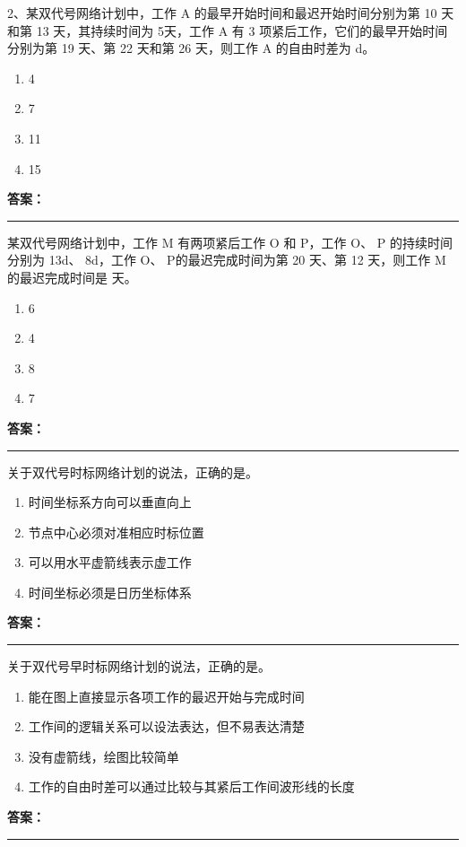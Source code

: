 \documentclass[UTF8,fontset=fandol,11pt]{ctexart}
\newcommand{\answerline}{\textcolor{answerred}{\rule{2.4cm}{0.7pt}}}
\begin{document}
\begin{quizbox}[title={第 8 题}]
2、某双代号网络计划中，工作 A 的最早开始时间和最迟开始时间分别为第 10 天和第 13 天，其持续时间为 5天，工作 A 有 3 项紧后工作，它们的最早开始时间分别为第 19 天、第 22 天和第 26 天，则工作 A 的自由时差为 d。\\
\begin{enumerate}[label=\Alph*.]
\item 4
\item 7
\item 11
\item 15
\end{enumerate}
\textbf{\textcolor{answerred}{答案：}} \answerline
\end{quizbox}

\begin{quizbox}[title={第 9 题}]
某双代号网络计划中，工作 M 有两项紧后工作 O 和 P，工作 O、 P 的持续时间分别为 13d、 8d，工作 O、 P的最迟完成时间为第 20 天、第 12 天，则工作 M 的最迟完成时间是 天。\\
\begin{enumerate}[label=\Alph*.]
\item 6
\item 4
\item 8
\item 7
\end{enumerate}
\textbf{\textcolor{answerred}{答案：}} \answerline
\end{quizbox}

\begin{quizbox}[title={第 10 题}]
关于双代号时标网络计划的说法，正确的是。\\
\begin{enumerate}[label=\Alph*.]
\item 时间坐标系方向可以垂直向上
\item 节点中心必须对准相应时标位置
\item 可以用水平虚箭线表示虚工作
\item 时间坐标必须是日历坐标体系
\end{enumerate}
\textbf{\textcolor{answerred}{答案：}} \answerline
\end{quizbox}

\begin{quizbox}[title={第 11 题}]
关于双代号早时标网络计划的说法，正确的是。\\
\begin{enumerate}[label=\Alph*.]
\item 能在图上直接显示各项工作的最迟开始与完成时间
\item 工作间的逻辑关系可以设法表达，但不易表达清楚
\item 没有虚箭线，绘图比较简单
\item 工作的自由时差可以通过比较与其紧后工作间波形线的长度
\end{enumerate}
\textbf{\textcolor{answerred}{答案：}} \answerline
\end{quizbox}
\end{document}
